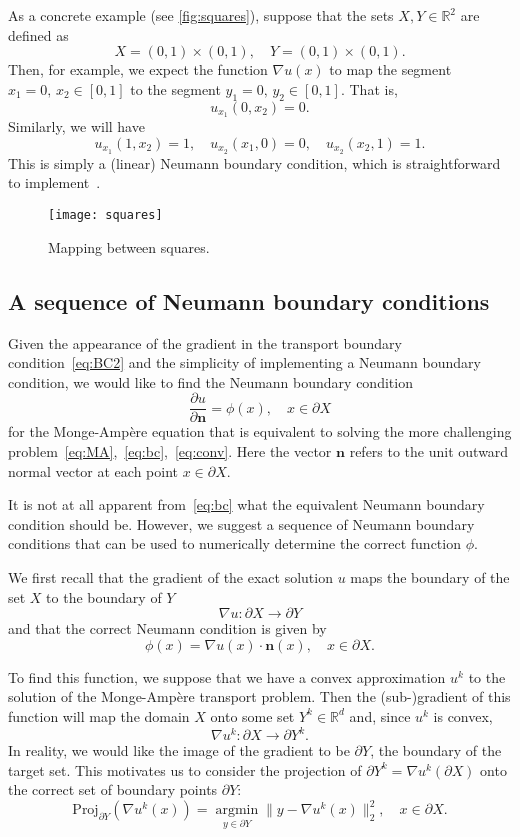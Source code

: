 \documentclass{amsart}
\theoremstyle{lemma}
\theoremstyle{remark}
\begin{document}
As a concrete example (see \autoref{fig:squares}), suppose that the sets $X,Y\in{\mathbb{R}}^2$ are defined as
\[ X = (0,1)\times(0,1),\quad Y = (0,1)\times(0,1). \]
Then, for example, we expect the function $\nabla u(x)$ to map the segment $x_1 = 0,\,x_2\in[0,1]$ to the segment $y_1=0,\,y_2\in[0,1]$.  That is,
\[ u_{x_1}(0,x_2) = 0. \]
Similarly, we will have
\[ u_{x_1}(1,x_2) = 1,\quad u_{x_2}(x_1,0) = 0,\quad u_{x_2}(x_2,1) = 1. \]
This is simply a (linear) Neumann boundary condition, which is straightforward to implement~\cite{BSnum,ObermanSINUM}.

\begin{figure}[htdp]
	\centering
        {\texttt{[image: squares]}}
  	\vspace*{-40pt}\caption{Mapping between squares.}
  	\label{fig:squares}
\end{figure} 

\subsection{A sequence of Neumann boundary conditions}\label{sec:neumann}
Given the appearance of the gradient in the transport boundary condition~\eqref{eq:BC2} and the simplicity of implementing a Neumann boundary condition, we would like to find the Neumann boundary condition 
\[  \frac{\partial u}{\partial {\mathbf{n}}} = \phi(x),\quad x\in\partial X \]
for the {{Monge-Amp\`ere}\xspace} equation that is equivalent to solving the more challenging problem~\eqref{eq:MA},~\eqref{eq:bc},~\eqref{eq:conv}.   Here the vector ${\mathbf{n}}$ refers to the unit outward normal vector at each point $x\in\partial X$.

It is not at all apparent from~\eqref{eq:bc} what the equivalent Neumann boundary condition should be. However, we suggest a sequence of Neumann boundary conditions that can be used to numerically determine the correct function $\phi$.

We first recall that the gradient of the exact solution $u$ maps the boundary of the set $X$ to the boundary of $Y$
\[ \nabla u:\partial X\to \partial Y \]
and that the correct Neumann condition is given by
\[ \phi(x) = \nabla u(x)\cdot {\mathbf{n}}(x),\quad x\in\partial X. \]

To find this function, we suppose that we have a convex approximation ${u^k}$ to the solution of the {{Monge-Amp\`ere}\xspace} transport problem.  Then the (sub-)gradient of this function will map the domain $X$ onto some set ${Y^k}\in{\mathbb{R}}^d$ and, since ${u^k}$ is convex,
\[ \nabla{u^k}:\partial X\to\partial{Y^k}. \]
In reality, we would like the image of the gradient to be $\partial Y$, the boundary of the target set.  This motivates us to consider the projection of $\partial{Y^k} = \nabla {u^k}(\partial X)$ onto the correct set of boundary points $\partial Y$:
\[ \text{Proj}_{\partial Y} (\nabla{u^k}(x)) = \operatorname*{argmin}\limits_{y\in\partial Y}{\|y - \nabla {u^k}(x)\|_2^2},\quad x\in\partial X. \]
\end{document}
